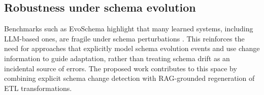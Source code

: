 \subsection{Robustness under schema evolution}

Benchmarks such as EvoSchema highlight that many learned systems, including
LLM-based ones, are fragile under schema perturbations
\cite{zhang2024evoschema}. This reinforces the need for approaches that
explicitly model schema evolution events and use change information to guide
adaptation, rather than treating schema drift as an incidental source of
errors. The proposed work contributes to this space by combining explicit
schema change detection with RAG-grounded regeneration of ETL transformations.


